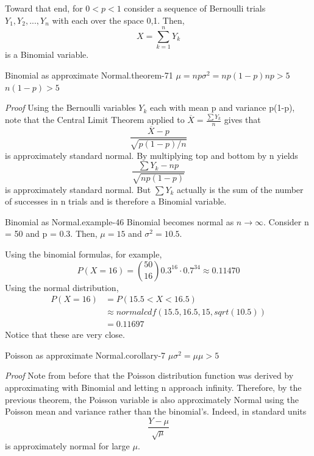 \documentclass[10pt,]{book}
\makeatletter
\renewcommand*{\proofname}{Proof}
\renewenvironment{proof}[1][\proofname]{\par
  \pushQED{\qed}%
  \normalfont \topsep6\p@\@plus6\p@\relax
  \trivlist
  \item\relax
    {\itshape
    #1\@addpunct{.}}\hspace\labelsep\ignorespaces
}{%
  \popQED\endtrivlist\@endpefalse
}
\numberwithin{equation}{section}
\newcommand{\lt}{<}
\newcommand{\gt}{>}
\makeatother
\begin{document}
\par
\hypertarget{p-1229}{}%
Toward that end, for \(0 \lt p \lt 1\) consider a sequence of Bernoulli trials \(Y_1, Y_2, ..., Y_n\) with each over the space {0,1}. Then,%
\begin{equation*}
X = \sum_{k=1}^n Y_k
\end{equation*}
is a Binomial variable.%
\begin{theorem}{Binomial as approximate Normal.}{}{theorem-71}%
\(\mu = np\)\(\sigma^2 = np(1-p)\)\(np \gt 5\)\(n(1-p) \gt 5\)\end{theorem}
\begin{proof}\hypertarget{proof-68}{}
\hypertarget{p-1230}{}%
Using the Bernoulli variables \(Y_k\) each with mean p and variance p(1-p), note that the Central Limit Theorem applied to \(\overline{X} = \frac{\sum Y_k}{n}\) gives that%
\begin{equation*}
\frac{\overline{X}-p}{\sqrt{p(1-p)/n}}
\end{equation*}
is approximately standard normal. By multiplying top and bottom by n yields%
\begin{equation*}
\frac{\sum Y_k - np}{\sqrt{np(1-p)}}
\end{equation*}
is approximately standard normal. But \(\sum Y_k\) actually is the sum of the number of successes in n trials and is therefore a Binomial variable.%
\end{proof}
\begin{example}{Binomial as Normal.}{example-46}%
\hypertarget{p-1231}{}%
Binomial becomes normal as \(n \rightarrow \infty\).  Consider n = 50 and p = 0.3.  Then, \(\mu = 15\) and \(\sigma^2 = 10.5\).%
\par
\hypertarget{p-1232}{}%
Using the binomial formulas, for example,%
\begin{equation*}
P( X = 16 ) = \binom{50}{16} 0.3^{16} \cdot 0.7^{34} \approx 0.11470
\end{equation*}
Using the normal distribution,%
\begin{align*}
P( X = 16 ) & = P( 15.5 \lt X \lt 16.5) \\
& \approx normalcdf(15.5,16.5,15,sqrt(10.5)) \\
& = 0.11697
\end{align*}
Notice that these are very close.%
\end{example}
\begin{corollary}{Poisson as approximate Normal.}{}{corollary-7}%
\(\mu\)\(\sigma^2 = \mu\)\(\mu \gt 5\)\end{corollary}
\begin{proof}\hypertarget{proof-69}{}
\hypertarget{p-1233}{}%
Note from before that the Poisson distribution function was derived by approximating with Binomial and letting n approach infinity. Therefore, by the previous theorem, the Poisson variable is also approximately Normal using the Poisson mean and variance rather than the binomial's. Indeed, in standard units%
\begin{equation*}
\frac{Y - \mu}{\sqrt{\mu}}
\end{equation*}
is approximately normal for large \(\mu\).%
\end{proof}
\end{document}
